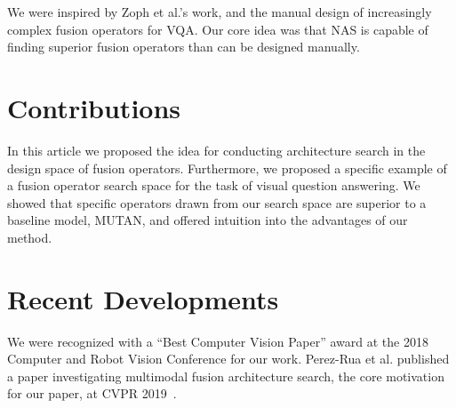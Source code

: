 We were inspired by Zoph et al.'s work, and the manual design of increasingly
complex fusion operators for VQA.
Our core idea was that NAS is capable of finding superior fusion operators than
can be designed manually.


\section{Contributions}

In this article we proposed the idea for conducting architecture search in the
design space of fusion operators.
Furthermore, we proposed a specific example of a fusion operator search space
for the task of visual question answering.
We showed that specific operators drawn from our search space are superior to a
baseline model, MUTAN, and offered intuition into the advantages of our method.


\section{Recent Developments}

We were recognized with a ``Best Computer Vision Paper'' award at the 2018
Computer and Robot Vision Conference for our work.
Perez-Rua et al. published a paper investigating multimodal fusion architecture
search, the core motivation for our paper, at CVPR
2019~\cite{Perez-Rua2019mfas}.
